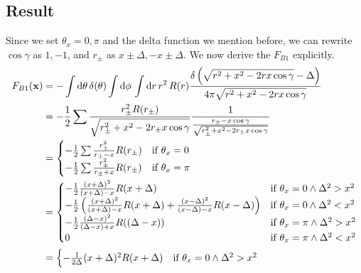 \documentclass[a4paper,12pt]{article}
\begin{document}
\subsection{Result}
Since we set $\theta_x = 0, \pi$ and the delta function we mention before, we can rewrite $\cos\gamma$ as $1, -1$, and $r_\pm$ as $x \pm \Delta, - x \pm \Delta$. We now derive the $F_{B1}$ explicitly.
\begin{align}
    F_{B1}(\mathbf{x}) &= - \int \mathrm{d}\theta\, \delta(\theta)  \int \mathrm{d}\phi\, \int \mathrm{d}r\, r^2 \, R(r) \frac{\delta\left(\sqrt{r^2 + x^2 - 2rx \cos\gamma} - \Delta\right)}{4\pi \sqrt{r^2 + x^2 - 2rx \cos\gamma}} \notag \\
                       &= - \frac{1}{2} \sum \frac{r_{\pm}^2 R(r_{\pm})}{\sqrt{r_{\pm}^2 + x^2 - 2r_{\pm}x\cos\gamma}} \frac{1}{\frac{r_{\pm} - x\cos\gamma}{\sqrt{r_{\pm}^2 + x^2 - 2r_{\pm}x\cos\gamma}}} \notag \\
                       &= 
                       \begin{cases}
                           - \frac{1}{2} \sum \frac{r_{\pm}^2}{r_{\pm} - x} R(r_{\pm}) & \text{if } \theta_x = 0 \\
                           - \frac{1}{2} \sum \frac{r_{\pm}^2}{r_{\pm} + x} R(r_{\pm}) & \text{if } \theta_x = \pi \\
                       \end{cases} \notag \\
                       &=
                       \begin{cases}
                           - \frac{1}{2} \frac{(x + \Delta)^2}{(x + \Delta) - x} R(x + \Delta) & \text{if } \theta_x = 0 \wedge \Delta^2 > x^2 \\
                           - \frac{1}{2} \left(\frac{(x + \Delta)^2}{(x + \Delta) - x} R(x + \Delta) + \frac{(x - \Delta)^2}{(x - \Delta) - x} R(x - \Delta)\right) & \text{if } \theta_x = 0 \wedge \Delta^2 < x^2 \\
                           - \frac{1}{2} \frac{(\Delta - x)^2}{(\Delta - x) + x} R((\Delta - x)) & \text{if } \theta_x = \pi \wedge \Delta^2 > x^2 \\
                           0 & \text{if } \theta_x = \pi \wedge \Delta^2 < x^2 \\
                       \end{cases} \notag \\
                       &=
                       \begin{cases}
                           - \frac{1}{2\Delta} (x + \Delta)^2 R(x + \Delta) & \text{if } \theta_x = 0 \wedge \Delta^2 > x^2 \\

\end{cases}
\end{align}
\end{document}
